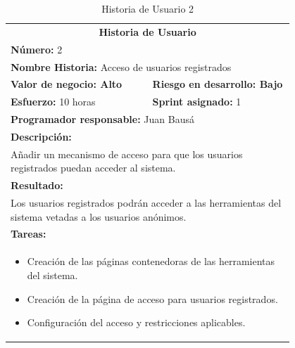 	\begin{table}[H]
	  \centering 
	  \begin{tabular}{p{0.4\linewidth}p{0.4\linewidth}}
	    \toprule
	    \multicolumn{2}{c}{\cellcolor{black!30}\textbf{Historia de Usuario}} 													\\
		\multicolumn{2}{l}{\cellcolor{gray!25}\textbf{Número: }2}																\\
		\multicolumn{2}{l}{\textbf{Nombre Historia: } Acceso de usuarios registrados}													\\
		\cellcolor{gray!25}\textbf{Valor de negocio: Alto}	&	\cellcolor{gray!25}\textbf{Riesgo en desarrollo: Bajo}			\\
		\textbf{Esfuerzo:} 10 horas				&	\textbf{Sprint asignado: }1 												\\
		\multicolumn{2}{l}{\cellcolor{gray!25}\textbf{Programador responsable: }Juan Bausá}									\\
		\multicolumn{2}{l}{\textbf{Descripción:}}                                                     						\\
		\multicolumn{2}{l}{\parbox{15cm}{Añadir un mecanismo de acceso para que los usuarios registrados puedan acceder al sistema.}}	\\
		\multicolumn{2}{l}{\cellcolor{gray!25}\textbf{Resultado:}}																\\
		\multicolumn{2}{l}{\parbox{15cm}{Los usuarios registrados podrán acceder a las herramientas del sistema vetadas a los usuarios anónimos.}} 						\\
		\multicolumn{2}{l}{\textbf{Tareas:}}																					\\
		\multicolumn{2}{l}{
			\begin{minipage}{5in}
	    		\vskip 4pt
	    		\begin{itemize}
	    			\item Creación de las páginas contenedoras de las herramientas del sistema.
	    			\item Creación de la página de acceso para usuarios registrados.
					\item Configuración del acceso y restricciones aplicables.
				\end{itemize}
			  	\vskip 4pt
		 	\end{minipage}
		} \\																				
	    \hline
	  \end{tabular}
	  \caption{Historia de Usuario 2}
	\end{table}
	
